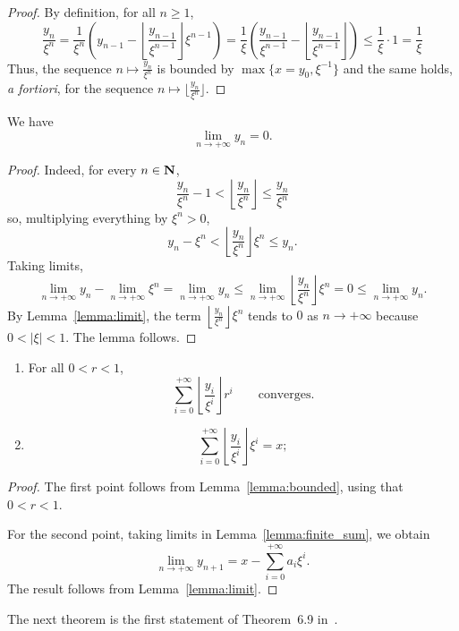 \begin{proof}
	By definition, for all $n\geq 1$,
	\[
		\frac{y_n}{\xi^n}=\frac{1}{\xi^n}\left(y_{n-1}-\left\lfloor\frac{y_{n-1}}{\xi^{n-1}}\right\rfloor\xi^{n-1}\right)=\frac{1}{\xi}\left(\frac{y_{n-1}}{\xi^{n-1}}-\left\lfloor\frac{y_{n-1}}{\xi^{n-1}}\right\rfloor\right)\le \frac{1}{\xi}\cdot 1= \frac{1}{\xi}
\]
Thus, the sequence $n\mapsto \frac{y_n}{\xi^n}$ is bounded by $\max\{x=y_0,\xi^{-1}\}$ and the same holds, \emph{a fortiori}, for the sequence $n\mapsto \lfloor\frac{y_n}{\xi^n}\rfloor$. 
\end{proof}
\begin{lemma}\label{lemma:limit}
We have
\[
\lim_{n\to+\infty} y_n =0.
\]
\end{lemma}
\begin{proof}
Indeed, for every $n\in \mathbf{N}$,
\[
\frac{y_n}{\xi^n} - 1 <\left\lfloor{\frac{y_n}{\xi^n}}\right\rfloor \le \frac{y_n}{\xi^n}
\]
so, multiplying everything by $\xi^n > 0$,
\[
y_n - \xi^n <\left\lfloor{\frac{y_n}{\xi^n}}\right\rfloor\xi^n \le y_n.
\]
Taking limits,
\[
\lim_{n\to+\infty}y_n-\lim_{n\to+\infty}\xi^n=\lim_{n\to+\infty}y_n\le \lim_{n\to+\infty}\left\lfloor\frac{y_n}{\xi^n}\right\rfloor\xi^n=0\le\lim_{n\to+\infty}y_n.
\]
By Lemma~\ref{lemma:limit}, the term $\left\lfloor\frac{y_n}{\xi^n}\right\rfloor\xi^n$  tends to $0$ as $n\to +\infty$ because $0<\lvert \xi\rvert< 1$. The lemma follows.
\end{proof}
\begin{proposition}\label{prop:convergence_theta}
\begin{enumerate}
\item For all $0<r <1$,
\[
\sum_{i=0}^{+\infty} \left\lfloor\frac{y_i}{\xi^i}\right\rfloor r^i \qquad\text{converges}.
\]
\item
\[
\sum_{i=0}^{+\infty} \left\lfloor\frac{y_i}{\xi^i}\right\rfloor\xi^i = x;
\]
\end{enumerate}
\end{proposition}
\begin{proof} 
The first point follows from Lemma~\ref{lemma:bounded}, using that $0<r<1$.

For the second point, taking limits in Lemma~\ref{lemma:finite_sum}, we obtain
\[
\lim_{n\to +\infty}y_{n+1}=x-\sum_{i=0}^{+\infty}a_i\xi^i.
\]
The result follows from Lemma~\ref{lemma:limit}.
\end{proof}
The next theorem is the first statement of Theorem~6.9 in~\cite{Analytic}.
